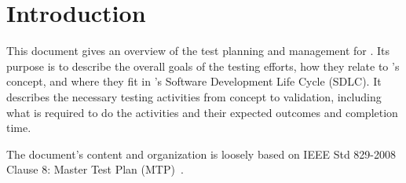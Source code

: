 \section{Introduction}
This document gives an overview of the test planning and management for
\progname{}. Its purpose is to describe the overall goals of the testing
efforts, how they relate to \progname{}'s concept, and where they fit in
\progname{}'s Software Development Life Cycle (SDLC). It describes the
necessary testing activities from concept to validation, including what is
required to do the activities and their expected outcomes and completion time.

The document's content and organization is loosely based on IEEE Std 829-2008
Clause 8: Master Test Plan (MTP)~\citep{vvDocIEEE}.





\clearpage



\clearpage




